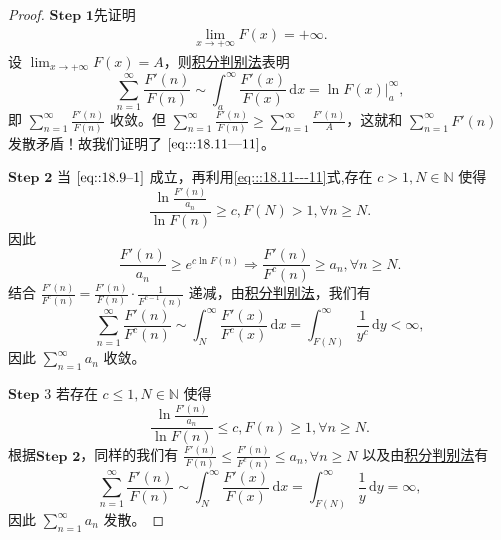 \documentclass[../../main.tex]{subfiles}%
\begin{document}
\begin{proof}

$\mathbf{Step}\,\,\mathbf{1}$先证明
\begin{align}
\lim_{x \to +\infty} F(x) = +\infty. \label{eq:::18.11---11}
\end{align}
设 \(\lim_{x \to +\infty} F(x) = A\)，则\hyperref[theorem:积分判别法]{积分判别法}表明
\[
\sum_{n=1}^\infty \frac{F'(n)}{F(n)} \sim \int_a^\infty \frac{F'(x)}{F(x)} \, \mathrm{d}x = \ln F(x) \big|_a^\infty,
\]
即 \(\sum_{n=1}^\infty \frac{F'(n)}{F(n)}\) 收敛。但 \(\sum_{n=1}^\infty \frac{F'(n)}{F(n)} \geqslant \sum_{n=1}^\infty \frac{F'(n)}{A}\)，这就和 \(\sum_{n=1}^\infty F'(n)\) 发散矛盾！故我们证明了 \(\eqref{eq:::18.11---11}\)。

$\mathbf{Step}\,\,\mathbf{2}$ 当 \(\eqref{eq::18.9--1}\) 成立，再利用\eqref{eq:::18.11---11}式,存在 \( c > 1, N \in \mathbb{N} \) 使得
\[
\frac{\ln \frac{F'(n)}{a_n}}{\ln F(n)} \geqslant c,F(N)>1, \forall n \geqslant N.
\]
因此
\[
\frac{F'(n)}{a_n} \geqslant e^{c \ln F(n)} \Rightarrow \frac{F'(n)}{F^c(n)} \geqslant a_n, \forall n \geqslant N.
\]
结合 \(\frac{F'(n)}{F^c(n)} = \frac{F'(n)}{F(n)} \cdot \frac{1}{F^{c - 1}(n)}\) 递减，由\hyperref[theorem:积分判别法]{积分判别法}，我们有
\[
\sum_{n=1}^\infty \frac{F'(n)}{F^c(n)} \sim \int_N^\infty \frac{F'(x)}{F^c(x)} \, \mathrm{d}x = \int_{F(N)}^\infty \frac{1}{y^c} \, \mathrm{d}y < \infty,
\]
因此 \(\sum_{n=1}^\infty a_n\) 收敛。

$\mathbf{Step}\,\,3$ 若存在 \( c \leqslant 1, N \in \mathbb{N} \) 使得
\[
\frac{\ln \frac{F'(n)}{a_n}}{\ln F(n)} \leqslant c, F(n) \geqslant 1, \forall n \geqslant N.
\]
根据$\mathbf{Step}\,\,\mathbf{2}$，同样的我们有 \(\frac{F'(n)}{F(n)} \leqslant \frac{F'(n)}{F^c(n)} \leqslant a_n, \forall n \geqslant N\) 以及由\hyperref[theorem:积分判别法]{积分判别法}有
\[
\sum_{n=1}^\infty \frac{F'(n)}{F(n)} \sim \int_N^\infty \frac{F'(x)}{F(x)} \, \mathrm{d}x = \int_{F(N)}^\infty \frac{1}{y} \, \mathrm{d}y = \infty,
\]
因此 \(\sum_{n=1}^\infty a_n\) 发散。

\end{proof}
\end{document}
